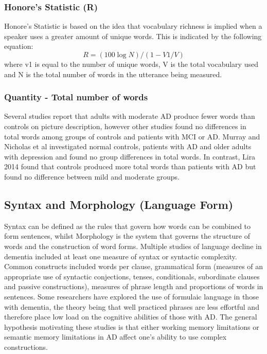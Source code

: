 \documentclass{article}
\begin{document}
\subsubsection{Honore's Statistic (R)} %
Honore's Statistic is based on the idea that vocabulary richness is implied when a speaker uses a greater amount of unique words. This is indicated by the following equation:
\begin{equation} \label{x3}
R = (100 \log N) / (1 - V1/V)
\end{equation}
where v1 is equal to the number of unique words, V is the total vocabulary used and N is the total number of words in the utterance being measured.
\subsubsection{Quantity - Total number of words}
Several studies report that adults with moderate AD produce fewer words than controls on picture description, however other studies found no differences in total words among groups of controls and patients with MCI or AD. Murray and Nicholas et al investigated normal controls, patients with AD and older adults with depression and found no group differences in total words. In contrast, Lira 2014 found that controls produced more total words than patients with AD but found no difference between mild and moderate groups. \newline
\par
\subsection{Syntax and Morphology (Language Form)}
Syntax can be defined as the rules that govern how words can be combined to form sentences, whilst Morphology is the system that governs the structure of words and the construction of word forms. Multiple studies of language decline in dementia included at least one measure of syntax or syntactic complexity. Common constructs included words per clause, grammatical form (measures of an appropriate use of syntactic conjections, tenses, conditionals, subordinate clauses and passive constructions), measures of phrase length and proportions of words in sentences. Some researchers have explored the use of formulaic language in those with dementia, the theory being that well practiced phrases are less effortful and therefore place low load on the cognitive abilities of those with AD. The general hypothesis motivating these studies is that either working memory limitations or semantic memory limitations in AD affect one's ability to use complex constructions. \newline
\par
\end{document}
